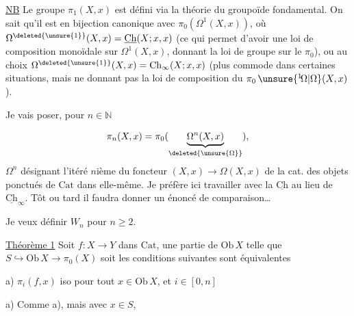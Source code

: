 \uline{NB} Le groupe $\pi_1(X,x)$ est défini via la théorie du groupoïde fondamental. On sait qu'il est en bijection canonique avec $\pi_0(\Omega^1(X,x))$, où $\Omega^{\deleted{\unsure{1}}}(X,x)=\underline{\mathrm{Ch}}(X;x,x)$ (ce qui permet d'avoir une loi de composition monoïdale sur $\Omega^1(X,x)$, donnant la loi de groupe sur le $\pi_0$), ou au choix $\Omega^{\deleted{\unsure{1}}}(X,x)=\mathrm{Ch}_{\infty}(X;x,x)$ (plus commode dans certaines situations, mais ne donnant pas  la loi de composition du $\pi_0\,\unsure{{}^{1}\!\Omega|\Omega}(X,x)$).

Je vais poser, pour $n\in\mathbb N$

\[
\pi_n(X,x)=\pi_0(\underbrace{\Omega^n(X,x)}_{\deleted{\unsure{\Omega}}}), 
\]
$\Omega^n$ désignant l'itéré $n$ième du foncteur $(X,x)\longrightarrow\Omega(X,x)$ de la cat.  des  objets ponctués de $\mathrm{Cat}$ dans elle-même. Je préfère  ici travailler avec la  $\underline{\mathrm{Ch}}$ au lieu de $\underline{\mathrm{Ch}}_\infty$. Tôt ou tard il faudra donner un énoncé de comparaison\ldots

Je veux définir $W_n$ pour $n\geq 2$.

\uline{Théorème\inserted{\unsure{$\checkmark$}} 1} Soit $f:X\to Y$ dans $\mathrm{Cat}$,    une partie de $\mathrm{Ob}\,X$ telle que  $S\hookrightarrow\mathrm{Ob}\,X\longrightarrow\pi_0(X)$ soit  les conditions suivantes sont équivalentes



a)  $\pi_i(f,x)$ iso pour tout $x\in\mathrm{Ob}\,X$, et  $i\in[0,n]$


a) Comme a), mais avec $x\in S$,


